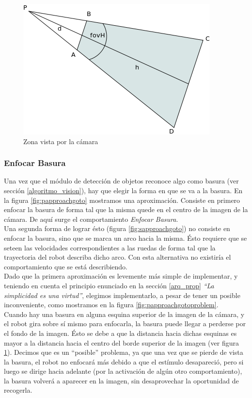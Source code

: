 \begin{figure}[htp]
\begin{center}
\includegraphics[scale=0.5]{comportamientos/rectangleWander.png}
\caption{Zona vista por la c\'amara}
\label{fig:zoneCamera}
\end{center}
\end{figure}

\subsubsection{Enfocar Basura}
\label{focus_garbage}
Una vez que el m\'odulo de detecci\'on de objetos reconoce algo como basura
(ver secci\'on \ref{algoritmo_vision}), hay que elegir
la forma en que se va a la basura. En la figura \ref{fig:papproachgoto}
mostramos una aproximaci\'on. Consiste en primero enfocar la
basura de forma tal que la misma quede en el centro de la imagen de la
c\'amara. De aqu\'i surge el comportamiento \emph{Enfocar Basura}.
\\
Una segunda forma de lograr \'esto (figura \ref{fig:sapproachgoto}) no consiste
en enfocar la basura, sino que se marca un arco hacia la misma. \'Esto requiere
que se seteen las velocidades correspondientes a las ruedas de forma tal que la
trayectoria del robot describa dicho arco. Con esta alternativa no
existir\'ia el comportamiento que se est\'a describiendo.
\\
Dado que la primera aproximaci\'on es levemente m\'as simple de implementar, y
teniendo en cuenta el principio enunciado en la secci\'on \ref{arq_prop}
\emph{``La simplicidad es una virtud''}, elegimos implementarlo, a
pesar de tener un posible inconveniente, como mostramos en la figura
\ref{fig:papproachgotoproblem}.
\\
Cuando hay una basura en alguna esquina superior de la imagen de la c\'amara,
y el robot gira sobre s\'i mismo para enfocarla, la basura puede llegar a
perderse por el fondo de la imagen. \'Esto se debe a que la distancia hacia
dichas esquinas es mayor a la distancia hacia el centro del borde superior de
la imagen (ver figura \ref{fig:zoneCamera}). Decimos que es un ``posible''
problema, ya que una vez que se pierde de vista la basura, el robot no
enfocar\'a m\'as debido a que el est\'imulo desapareci\'o, pero si luego se
dirige hacia adelante (por la activaci\'on de alg\'un otro comportamiento), la
basura volver\'a a aparecer en la imagen, sin desaprovechar la oportunidad de
recogerla.

